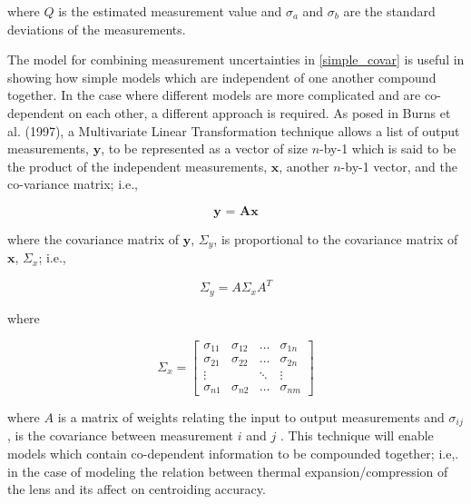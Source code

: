 where $Q$ is the estimated measurement value and $\sigma_a$ and $\sigma_b$ are the standard deviations of the measurements.

\par \qquad The model for combining measurement uncertainties in \eqref{simple_covar} is useful in showing how simple models which are independent of one another compound together.
In the case where different models are more complicated and are co-dependent on each other, a different approach is required.
As posed in Burns et al. (1997), a Multivariate Linear Transformation technique allows a list of output measurements, $\textbf{y}$, to be represented as a vector of size $n$-by-1 which is said to be the product of the independent measurements, $\textbf{x}$, another $n$-by-1 vector, and the co-variance matrix; i.e., 

\begin{equation}
    \textbf{y = Ax}
\end{equation}

where the covariance matrix of $\textbf{y}$, $\Sigma_y$, is proportional to the covariance matrix of $\textbf{x}$, $\Sigma_x$; i.e., 

\begin{equation}
    \Sigma_y = A\Sigma_xA^T
\end{equation}

where

\begin{equation}
    \Sigma_x = 
    \begin{bmatrix}
        \sigma_{11} & \sigma_{12} & \dots & \sigma_{1n} \\
        \sigma_{21} & \sigma_{22} & \dots & \sigma_{2n} \\
        \vdots & & \ddots & \vdots \\
        \sigma_{n1} & \sigma_{n2} & \dots &  \sigma_{nm}
    \end{bmatrix}
\end{equation}

where $A$ is a matrix of weights relating the input to output measurements and $\sigma_{ij}$, is the covariance between measurement $i$ and $j$ \cite{error_prop_in_imaging}.
This technique will enable models which contain co-dependent information to be compounded together; i.e,. in the case of modeling the relation between thermal expansion/compression of the lens and its affect on centroiding accuracy.


